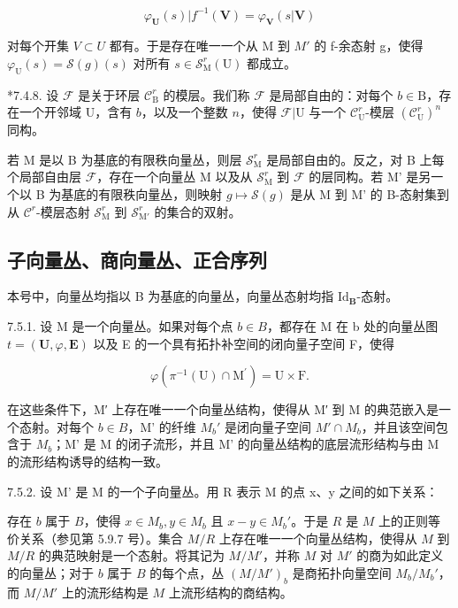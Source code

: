 \[
\varphi_ {\mathbf {U}} (s) | f ^ {- 1} (\mathbf {V}) = \varphi_ {\mathbf {V}} (s | \mathbf {V})
\]

对每个开集 \(V \subset U\) 都有。于是存在唯一一个从 M 到 \(M'\) 的 f-余态射 g，使得 \(\varphi_{\mathrm{U}}(s) = \mathcal{S}(g)(s)\) 对所有 \(s \in \mathcal{S}_{\mathrm{M}}^{r}(\mathrm{U})\) 都成立。

*7.4.8. 设 \(\mathcal{F}\) 是关于环层 \(\mathcal{C}_{\mathrm{B}}^{r}\) 的模层。我们称 \(\mathcal{F}\) 是局部自由的：对每个 \(b \in \mathrm{B}\)，存在一个开邻域 U，含有 \(b\)，以及一个整数 \(n\)，使得 \(\mathcal{F}|\mathrm{U}\) 与一个 \(\mathcal{C}_{\mathrm{U}}^{r}\)-模层 \((\mathcal{C}_{\mathrm{U}}^{r})^{n}\) 同构。

若 M 是以 B 为基底的有限秩向量丛，则层 \(\mathcal{S}_{\mathrm{M}}^{r}\) 是局部自由的。反之，对 B 上每个局部自由层 \(\mathcal{F}\)，存在一个向量丛 M 以及从 \(\mathcal{S}_{\mathrm{M}}^{r}\) 到 \(\mathcal{F}\) 的层同构。若 M' 是另一个以 B 为基底的有限秩向量丛，则映射 \(g \mapsto \mathcal{S}(g)\) 是从 M 到 M' 的 B-态射集到从 \(\mathcal{C}^{r}\)-模层态射 \(\mathcal{S}_{\mathrm{M}}^{r}\) 到 \(\mathcal{S}_{\mathrm{M}'}^{r}\) 的集合的双射。

\subsection{子向量丛、商向量丛、正合序列}

本号中，向量丛均指以 B 为基底的向量丛，向量丛态射均指 \(\mathrm{Id}_{\mathbf{B}}\)-态射。

7.5.1. 设 M 是一个向量丛。如果对每个点 \(b \in B\)，都存在 M 在 b 处的向量丛图 \(t = (\mathbf{U}, \varphi, \mathbf{E})\) 以及 E 的一个具有拓扑补空间的闭向量子空间 F，使得

\[
\varphi (\pi^ {- 1} (\mathrm{U}) \cap \mathrm{M} ^ {\prime}) = \mathrm{U} \times \mathrm{F}.
\]

在这些条件下，M′ 上存在唯一一个向量丛结构，使得从 M′ 到 M 的典范嵌入是一个态射。对每个 \(b \in B\)，M' 的纤维 \(M_{b}'\) 是闭向量子空间 \(M' \cap M_{b}\)，并且该空间包含于 \(M_{b}\)；M' 是 M 的闭子流形，并且 M' 的向量丛结构的底层流形结构与由 M 的流形结构诱导的结构一致。

7.5.2. 设 M' 是 M 的一个子向量丛。用 R 表示 M 的点 x、y 之间的如下关系：

存在 \(b\) 属于 \(B\)，使得 \(x \in M_b, y \in M_b\) 且 \(x - y \in M_b'\)。于是 \(R\) 是 \(M\) 上的正则等价关系（参见第 5.9.7 号）。集合 \(M/R\) 上存在唯一一个向量丛结构，使得从 \(M\) 到 \(M/R\) 的典范映射是一个态射。将其记为 \(M/M'\)，并称 \(M\) 对 \(M'\) 的商为如此定义的向量丛；对于 \(b\) 属于 \(B\) 的每个点，丛 \((M/M')_b\) 是商拓扑向量空间 \(M_b/M_b'\)，而 \(M/M'\) 上的流形结构是 \(M\) 上流形结构的商结构。

